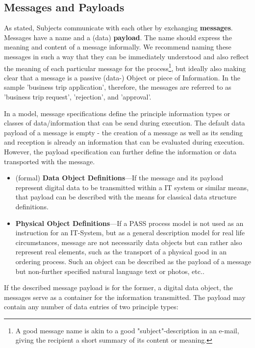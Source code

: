 \subsection{Messages and Payloads}

As stated, Subjects communicate with each other by exchanging \textbf{messages}. Messages have a name and a (data) \textbf{payload}. The name should express the meaning and content of a message informally. We recommend naming these messages in such a way that they can be immediately understood and also reflect the meaning of each particular message for the process\footnote{A good message name is akin to a good "subject"-description in an e-mail, giving the recipient a short summary of its content or meaning.}, but ideally also making clear that a message is a passive (data-) Object or piece of Information. In the sample 'business trip application', therefore, the messages are referred to as 'business trip request', 'rejection', and 'approval'.

In a model, message specifications define the principle information types or classes of data/information that can be send during execution. The default data payload of a message is empty - the creation of a message as well as its sending and reception is already an information that can be evaluated during execution. However, the payload specification can further define the information or data transported with the message. 

\begin{itemize}
    \item (formal) \textbf{Data Object Definitions}---If the message and its payload represent digital data to be transmitted within a IT system or similar means, that payload can be described with the means for classical data structure definitions. 
    \item \textbf{Physical Object Definitions}---If a PASS process model is not used as an instruction for an IT-System, but as a general description model for real life circumstances, message are not necessarily data objects but can rather also represent real elements, such as the transport of a physical good in an ordering process. Such an object can be described as the payload of a message but non-further specified natural language text or photos, etc..
\end{itemize}

If the described message payload is for the former, a digital data object, the messages serve as a container for the information transmitted. The payload may contain any number of data entries of two principle types:

